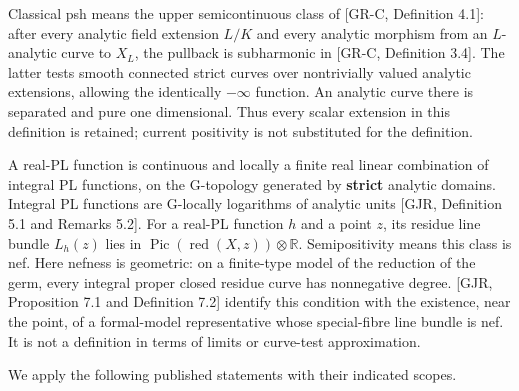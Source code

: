 \documentclass[
  11pt,
]{article}
\begin{document}
Classical psh means the upper semicontinuous class of {[}GR-C,
Definition 4.1{]}: after every analytic field extension \(L/K\) and
every analytic morphism from an \(L\)-analytic curve to \(X_L\), the
pullback is subharmonic in {[}GR-C, Definition 3.4{]}. The latter tests
smooth connected strict curves over nontrivially valued analytic
extensions, allowing the identically \(-\infty\) function. An analytic
curve there is separated and pure one dimensional. Thus every scalar
extension in this definition is retained; current positivity is not
substituted for the definition.

A real-PL function is continuous and locally a finite real linear
combination of integral PL functions, on the G-topology generated by
\textbf{strict} analytic domains. Integral PL functions are G-locally
logarithms of analytic units {[}GJR, Definition 5.1 and Remarks 5.2{]}.
For a real-PL function \(h\) and a point \(z\), its residue line bundle
\(L_h(z)\) lies in
\(\operatorname{Pic}(\operatorname{red}(X,z))\otimes\mathbb R\).
Semipositivity means this class is nef. Here nefness is geometric: on a
finite-type model of the reduction of the germ, every integral proper
closed residue curve has nonnegative degree. {[}GJR, Proposition 7.1 and
Definition 7.2{]} identify this condition with the existence, near the
point, of a formal-model representative whose special-fibre line bundle
is nef. It is not a definition in terms of limits or curve-test
approximation.

We apply the following published statements with their indicated scopes.
\end{document}
